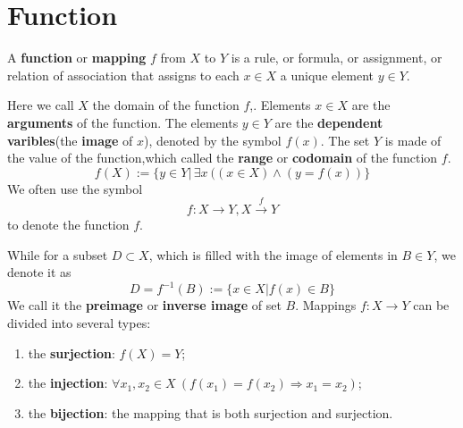 \section{Function}

A \textbf{function} or \textbf{mapping} $f$ from $X$ to $Y$ is a rule, or formula, or assignment, or relation of association that assigns to each $x\in X$ a unique element $y\in Y$.

Here we call $X$ the domain of the function $f$,. Elements $x\in X$ are the \textbf{arguments}  of the function. The elements $y\in Y$ are the \textbf{dependent varibles}(the \textbf{image} of $x$), denoted by the symbol $f(x)$.
The set $Y$ is made of the value of the function,which called the \textbf{range} or \textbf{codomain} of the function $f$.
\[f(X):=\{y\in Y|\, \exists x\ ((x\in X)\wedge(y=f(x))\}\]
We often use the symbol \[f:X\longrightarrow Y,X\stackrel{f}{\longrightarrow}Y\]to denote the function $f$.


While for a subset $D\subset X$, which is filled with the image of elements in $B\in Y$, we denote it as
\[D=f^{-1}(B):=\{x\in X|f(x)\in B\}\]
We call it the \textbf{preimage} or \textbf{inverse image} of set $B$.
Mappings $f:X\rightarrow Y$ can be divided into several types:
\begin{enumerate}
    \item the \textbf{surjection}: $f(X)=Y$;
    \item the \textbf{injection}: $\forall x_{1},x_{2}\in X\ (f(x_{1})=f(x_{2})\Rightarrow x_{1}=x_{2})$;
    \item the \textbf{bijection}: the mapping that is both surjection and surjection.
\end{enumerate}